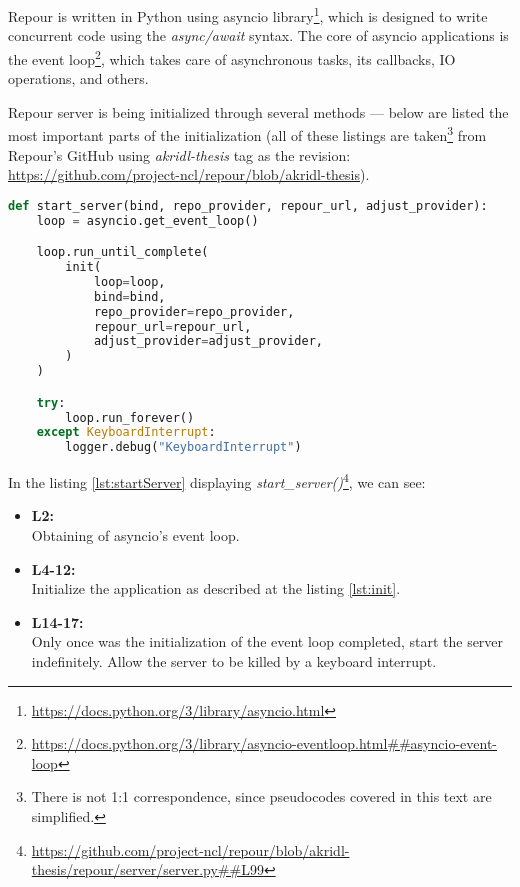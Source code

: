 \documentclass[../main.tex]{subfiles}
\begin{document}
Repour is written in Python using asyncio library\footnote{\url{https://docs.python.org/3/library/asyncio.html}}, which is designed to write concurrent code using the \textit{async/await} syntax. The core of asyncio applications is the event loop\footnote{\url{https://docs.python.org/3/library/asyncio-eventloop.html##asyncio-event-loop}}, which takes care of asynchronous tasks, its callbacks, IO operations, and others.

Repour server is being initialized through several methods — below are listed the most important parts of the initialization (all of these listings are taken\footnote{There is not 1:1 correspondence, since pseudocodes covered in this text are simplified.} from Repour's GitHub using \textit{akridl-thesis} tag as the revision: \url{https://github.com/project-ncl/repour/blob/akridl-thesis}).

\begin{lstlisting}[language=Python, caption=Server initialization: \textit{start\_server} method, label={lst:startServer}]
def start_server(bind, repo_provider, repour_url, adjust_provider):
    loop = asyncio.get_event_loop()

    loop.run_until_complete(
        init(
            loop=loop,
            bind=bind,
            repo_provider=repo_provider,
            repour_url=repour_url,
            adjust_provider=adjust_provider,
        )
    )

    try:
        loop.run_forever()
    except KeyboardInterrupt:
        logger.debug("KeyboardInterrupt")
\end{lstlisting}

In the listing \ref{lst:startServer} displaying \textit{start\_server()}\footnote{\url{https://github.com/project-ncl/repour/blob/akridl-thesis/repour/server/server.py##L99}}, we can see:
\begin{itemize}
    \item \textbf{L2:}\\
    Obtaining of asyncio's event loop.

    \item \textbf{L4-12:}\\
    Initialize the application as described at the listing \ref{lst:init}.

    \item \textbf{L14-17:}\\
    Only once was the initialization of the event loop completed, start the server indefinitely. Allow the server to be killed by a keyboard interrupt.
\end{itemize}
\end{document}
